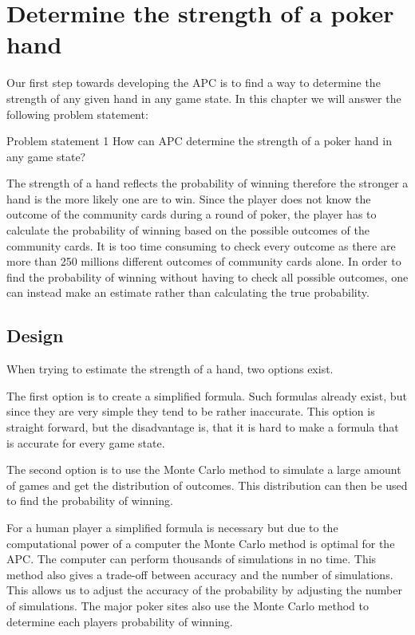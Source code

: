 \section{Determine the strength of a poker hand}
\label{sec:part1}
Our first step towards developing the APC is to find a way to determine the strength of any given hand in any game state. In this chapter we will answer the following problem statement: 

\vspace{4mm}
\begin{statementBox2}{Problem statement 1}
How can APC determine the strength of a poker hand in any game state?
\end{statementBox2}
\vspace{4mm}

The strength of a hand reflects the probability of winning therefore the stronger a hand is the more likely one are to win. Since the player does not know the outcome of the community cards during a round of poker, the player has to calculate the probability of winning based on the possible outcomes of the community cards. It is too time consuming to check every outcome as there are more than 250 millions different outcomes of community cards alone. In order to find the probability of winning without having to check all possible outcomes, one can instead make an estimate rather than calculating the true probability. 

\subsection{Design}
When trying to estimate the strength of a hand, two options exist.

The first option is to create a simplified formula. Such formulas already exist, but since they are very simple they tend to be rather inaccurate. This option is straight forward, but the disadvantage is, that it is hard to make a formula that is accurate for every game state.

The second option is to use the Monte Carlo method to simulate a large amount of games and get the distribution of outcomes. This distribution can then be used to find the probability of winning.

For a human player a simplified formula is necessary but due to the computational power of a computer the Monte Carlo method is optimal for the APC. The computer can perform thousands of simulations in no time. This method also gives a trade-off between accuracy and the number of simulations. This allows us to adjust the accuracy of the probability by adjusting the number of simulations. The major poker sites also use the Monte Carlo method to determine each players probability of winning.

